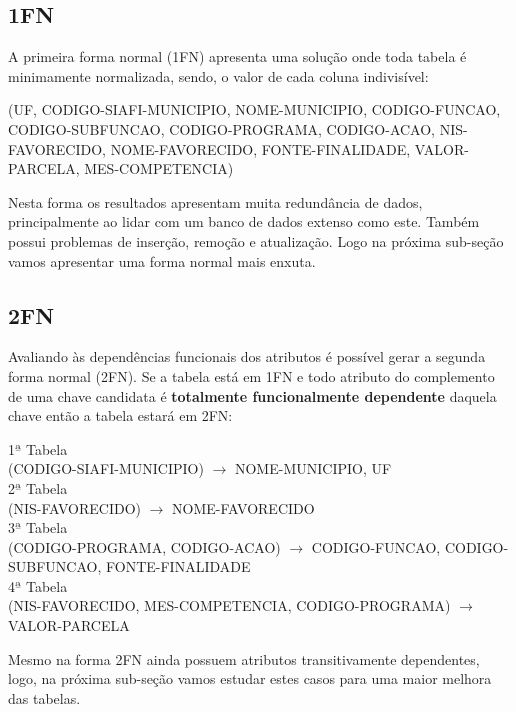 \documentclass[12pt]{article}
\begin{document}
	\subsection{1FN}
	\label{sec:1fn}
	
	A primeira forma normal (1FN) apresenta uma solução onde toda tabela é minimamente normalizada, sendo, o valor de cada coluna indivisível: \\
	
	\begin{center}
		(UF, CODIGO-SIAFI-MUNICIPIO, NOME-MUNICIPIO, CODIGO-FUNCAO, CODIGO-SUBFUNCAO, CODIGO-PROGRAMA, CODIGO-ACAO, NIS-FAVORECIDO, NOME-FAVORECIDO, FONTE-FINALIDADE, VALOR-PARCELA, MES-COMPETENCIA) 
		\label{tab:1fn}
	\end{center} 
	
	Nesta forma os resultados apresentam muita redundância de dados, principalmente ao lidar com um banco de dados extenso como este. Também possui problemas de inserção, remoção e atualização. Logo na próxima sub-seção vamos apresentar uma forma normal mais enxuta. 
	
	\subsection{2FN}
	\label{sec:2fn}
	
	Avaliando às dependências funcionais dos atributos é possível gerar a segunda forma normal (2FN). Se a tabela está em 1FN e todo atributo do complemento de uma chave candidata é \textbf{totalmente funcionalmente dependente} daquela chave então a tabela estará em 2FN:
	
	\begin{center}
		1$ª$ Tabela \\ (CODIGO-SIAFI-MUNICIPIO) $\rightarrow$ NOME-MUNICIPIO, UF \\
		2$ª$ Tabela \\
		(NIS-FAVORECIDO) $\rightarrow$ NOME-FAVORECIDO \\
		3$ª$ Tabela \\
		(CODIGO-PROGRAMA, CODIGO-ACAO) $\rightarrow$ CODIGO-FUNCAO, CODIGO-SUBFUNCAO, FONTE-FINALIDADE \\
		4$ª$ Tabela \\
		(NIS-FAVORECIDO, MES-COMPETENCIA, CODIGO-PROGRAMA) $\rightarrow$ VALOR-PARCELA \\
		\label{tab:2fn}
	\end{center} 
	
	Mesmo na forma 2FN ainda possuem atributos transitivamente dependentes, logo, na próxima sub-seção vamos estudar estes casos para uma maior melhora das tabelas.
	
\end{document}
